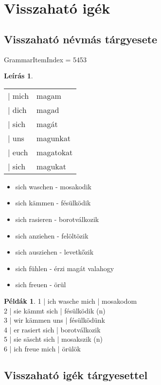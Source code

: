 \documentclass{article}
\theoremstyle{definition}
\newtheorem*{exmp}{Példák}
\newtheorem*{desc}{Leírás}
\begin{document}
\section{Visszaható igék}

\subsection{Visszaható névmás tárgyesete}

GrammarItemIndex = 5453

\begin{desc}
\begin{tabular}{ll}
 | mich & magam \\
 | dich & magad \\
 | sich & magát \\
 | uns & magunkat \\
 | euch & magatokat \\
 | sich & magukat \\
\end{tabular}

\begin{itemize}
\item sich waschen - mosakodik
\item sich kämmen - fésülködik
\item sich rasieren - borotválkozik
\item sich anziehen - felöltözik
\item sich ausziehen - levetkőzik
\item sich fühlen - érzi magát valahogy
\item sich freuen - örül
\end{itemize}
\end{desc}

\begin{exmp}
1 | ich wasche mich | mosakodom\\
2 | sie kämmt sich | fésülködik (n)\\
3 | wir kämmen uns | fésülködünk\\
4 | er rasiert sich | borotválkozik\\
5 | sie säscht sich | mosakszik (n)\\
6 | ich freue mich | örülök\\
\end{exmp}

\subsection{Visszaható igék tárgyesettel}
\end{document}
